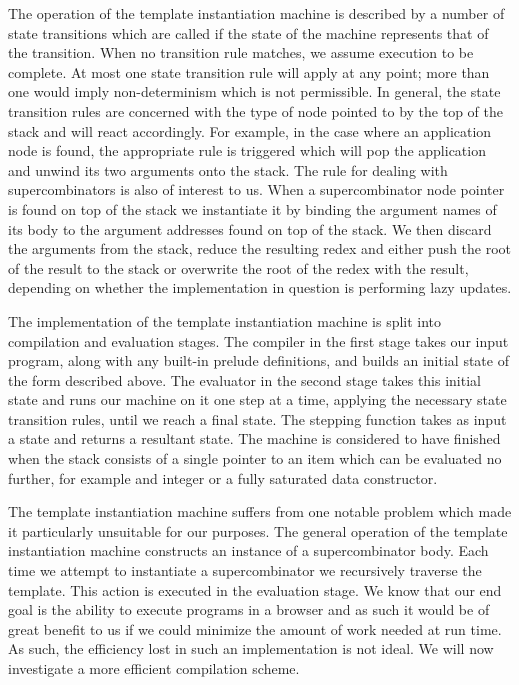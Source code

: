 The operation of the template instantiation machine is described
by a number of state transitions which are called if the state
of the machine represents that of the transition. When no
transition rule matches, we assume execution to be complete. 
At most one state transition rule will apply at any point;
more than one would imply non-determinism which is not
permissible. In general, the state transition rules are
concerned with the type of node pointed to by the top of the
stack and will react accordingly. For example, in the case
where an application node is found, the appropriate rule
is triggered which will pop the application and unwind its
two arguments onto the stack. The rule for dealing with 
supercombinators is also of interest to us. When a 
supercombinator node pointer is found on top of the stack
we instantiate it by binding the argument names of its
body to the argument addresses found on top of the stack.
We then discard the arguments from the stack, reduce the
resulting redex and either push the root of the result 
to the stack or overwrite the root of the redex with the
result, depending on whether the implementation in question
is performing lazy updates. 

The implementation of the template instantiation machine is
split into compilation and evaluation stages. The compiler
in the first stage takes our input program, along with
any built-in prelude definitions, and builds an initial
state of the form described above. The evaluator in the 
second stage takes this initial state and runs our machine
on it one step at a time, applying the necessary state
transition rules, until we reach a final state. The stepping
function takes as input a state and returns a resultant
state. The machine is considered to have finished when 
the stack consists of a single pointer to an item which
can be evaluated no further, for example and integer or
a fully saturated data constructor. 


The template instantiation machine suffers from one notable
problem which made it particularly unsuitable for our
purposes. The general operation of the template instantiation
machine constructs an instance of a supercombinator body.
Each time we attempt to instantiate a supercombinator we
recursively traverse the template. This action is executed
in the evaluation stage. We know that our end goal is the
ability to execute programs in a browser and as such it would
be of great benefit to us if we could minimize the amount of
work needed at run time. As such, the efficiency 
lost in such an implementation is not ideal. We will now
investigate a more efficient compilation scheme.


